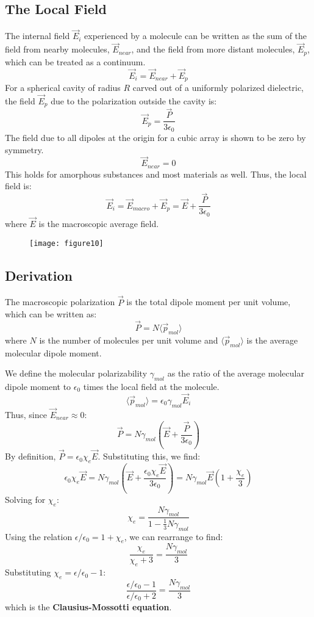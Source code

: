 \documentclass{article}
\begin{document}
	\subsection{The Local Field}
	The internal field $\vec{E}_i$ experienced by a molecule can be written as the sum of the field from nearby molecules, $\vec{E}_{near}$, and the field from more distant molecules, $\vec{E}_p$, which can be treated as a continuum.
	\[
	\vec{E}_i = \vec{E}_{near} + \vec{E}_p
	\]
	For a spherical cavity of radius $R$ carved out of a uniformly polarized dielectric, the field $\vec{E}_p$ due to the polarization outside the cavity is:
	\[
	\vec{E}_p = \frac{\vec{P}}{3\epsilon_0}
	\]
	The field due to all dipoles at the origin for a cubic array is shown to be zero by symmetry.
	\[
	\vec{E}_{near} = 0
	\]
	This holds for amorphous substances and most materials as well. Thus, the local field is:
	\[
	\vec{E}_i = \vec{E}_{macro} + \vec{E}_p = \vec{E} + \frac{\vec{P}}{3\epsilon_0}
	\]
	where $\vec{E}$ is the macroscopic average field.
	
	\begin{figure}[h]
		\centering
		\texttt{[image: figure10]}
		\caption{}
		\label{fig:figure10}
	\end{figure}
	
	\subsection{Derivation}
	The macroscopic polarization $\vec{P}$ is the total dipole moment per unit volume, which can be written as:
	\[
	\vec{P} = N \langle \vec{p}_{mol} \rangle
	\]
	where $N$ is the number of molecules per unit volume and $\langle \vec{p}_{mol} \rangle$ is the average molecular dipole moment.
	
	We define the molecular polarizability $\gamma_{mol}$ as the ratio of the average molecular dipole moment to $\epsilon_0$ times the local field at the molecule.
	\[
	\langle \vec{p}_{mol} \rangle = \epsilon_0 \gamma_{mol} \vec{E}_i
	\]
	Thus, since $\vec{E}_{near} \approx 0$:
	\[
	\vec{P} = N \gamma_{mol} (\vec{E} + \frac{\vec{P}}{3\epsilon_0})
	\]
	By definition, $\vec{P} = \epsilon_0 \chi_e \vec{E}$. Substituting this, we find:
	\[
	\epsilon_0 \chi_e \vec{E} = N \gamma_{mol} (\vec{E} + \frac{\epsilon_0 \chi_e \vec{E}}{3\epsilon_0}) = N \gamma_{mol} \vec{E} (1 + \frac{\chi_e}{3})
	\]
	Solving for $\chi_e$:
	\[
	\chi_e = \frac{N \gamma_{mol}}{1 - \frac{1}{3}N \gamma_{mol}}
	\]
	Using the relation $\epsilon/\epsilon_0 = 1 + \chi_e$, we can rearrange to find:
	\[
	\frac{\chi_e}{\chi_e + 3} = \frac{N \gamma_{mol}}{3}
	\]
	Substituting $\chi_e = \epsilon/\epsilon_0 - 1$:
	\[
	\frac{\epsilon/\epsilon_0 - 1}{\epsilon/\epsilon_0 + 2} = \frac{N \gamma_{mol}}{3}
	\]
	which is the \textbf{Clausius-Mossotti equation}.
\end{document}
